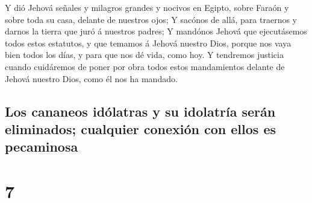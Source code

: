  Y dió Jehová señales y milagros grandes y nocivos en
Egipto, sobre Faraón y sobre toda su casa, delante de nuestros ojos;
 Y sacónos de allá, para traernos y darnos la tierra que
juró á nuestros padres;  Y mandónos Jehová que ejecutásemos
todos estos estatutos, y que temamos á Jehová nuestro Dios, porque nos
vaya bien todos los días, y para que nos dé vida, como hoy.
 Y tendremos justicia cuando cuidáremos de poner por obra
todos estos mandamientos delante de Jehová nuestro Dios, como él nos ha
mandado.

\hypertarget{los-cananeos-iduxf3latras-y-su-idolatruxeda-seruxe1n-eliminados-cualquier-conexiuxf3n-con-ellos-es-pecaminosa}{%
\subsection{Los cananeos idólatras y su idolatría serán eliminados;
cualquier conexión con ellos es
pecaminosa}\label{los-cananeos-iduxf3latras-y-su-idolatruxeda-seruxe1n-eliminados-cualquier-conexiuxf3n-con-ellos-es-pecaminosa}}

\hypertarget{section-6}{%
\section{7}\label{section-6}}

